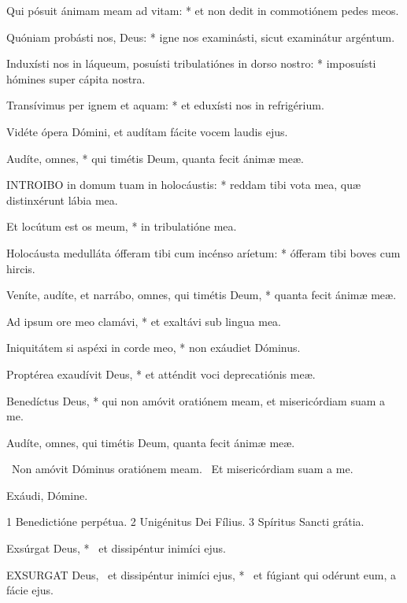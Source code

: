 Qui pósuit ánimam meam ad vitam: * et non dedit in commotiónem pedes meos.

Quóniam probásti nos, Deus: * igne nos examinásti, sicut examinátur argéntum.

Induxísti nos in láqueum, posuísti tribulatiónes in dorso nostro: * imposuísti hómines super cápita nostra.

Transívimus per ignem et aquam: * et eduxísti nos in refrigérium.

 Vidéte ópera Dómini, et audítam fácite vocem laudis ejus.

 Audíte, omnes, * qui timétis Deum, quanta fecit ánimæ meæ.


\lettrine[lines=2]{I}{NTROIBO} in domum tuam in holocáustis: * reddam tibi vota mea, quæ distinxérunt lábia mea.

Et locútum est os meum, * in tribulatióne mea.

Holocáusta medulláta ófferam tibi cum incénso aríetum: * ófferam tibi boves cum hircis.

Veníte, audíte, et narrábo, omnes, qui timétis Deum, * quanta fecit ánimæ meæ.

Ad ipsum ore meo clamávi, * et exaltávi sub lingua mea.

Iniquitátem si aspéxi in corde meo, * non exáudiet Dóminus.

Proptérea exaudívit Deus, * et atténdit voci deprecatiónis meæ.

Benedíctus Deus, * qui non amóvit oratiónem meam, et misericórdiam suam a me.

 Audíte, omnes, qui timétis Deum, quanta fecit ánimæ meæ.


\V\ Non amóvit Dóminus oratiónem meam. \R\ Et misericórdiam suam a me.

 Exáudi, Dómine.

 1 Benedictióne perpétua. 2 Unigénitus Dei Fílius. 3 Spíritus Sancti grátia.


 Exsúrgat Deus, * \textdagger\ et dissipéntur inimíci ejus. \textdaggerdbl


\lettrine[lines=2]{E}{XSURGAT} Deus, \textdagger\ et dissipéntur inimíci ejus, * \textdaggerdbl\ et fúgiant qui odérunt eum, a fácie ejus.

